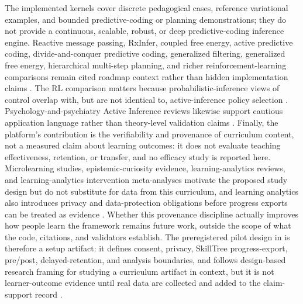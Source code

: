 \documentclass[
  english,
]{article}
\begin{document}
The implemented kernels cover discrete pedagogical cases, reference
variational examples, and bounded predictive-coding or planning
demonstrations; they do not provide a continuous, scalable, robust, or
deep predictive-coding inference engine. Reactive message passing,
RxInfer, coupled free energy, active predictive coding,
divide-and-conquer predictive coding, generalized filtering, generalized
free energy, hierarchical multi-step planning, and richer
reinforcement-learning comparisons remain cited roadmap context rather
than hidden implementation claims
\citep{bagaev2023reactive_message_passing, bagaev2023rxinfer, nelson2025coupled_free_energy, rao2024active_predictive_coding, sennesh2024dcpc, friston2008dem, friston2010generalised, parr2019generalised}.
The RL comparison matters because probabilistic-inference views of
control overlap with, but are not identical to, active-inference policy
selection \citep{levine2018probabilistic}. Psychology-and-psychiatry
Active Inference reviews likewise support cautious application language
rather than theory-level validation claims
\citep{badcock2024psychology_psychiatry}. Finally, the platform's
contribution is the verifiability and provenance of curriculum content,
not a measured claim about learning outcomes: it does not evaluate
teaching effectiveness, retention, or transfer, and no efficacy study is
reported here. Microlearning studies, epistemic-curiosity evidence,
learning-analytics reviews, and learning-analytics intervention
meta-analyses motivate the proposed study design but do not substitute
for data from this curriculum, and learning analytics also introduces
privacy and data-protection obligations before progress exports can be
treated as evidence
\citep{monib2024microlearning_boundaries, rof2024microlearning_satisfaction, emin2026epistemic_curiosity_mind_wandering, liu2025learning_analytics_intervention_meta, hernandezcampos2025_learning_analytics_outcomes, liu2023_learning_analytics_privacy}.
Whether this provenance discipline actually improves how people learn
the framework remains future work, outside the scope of what the code,
citations, and validators establish. The preregistered pilot design in
 is therefore a setup artifact: it defines
consent, privacy, SkillTree progress-export, pre/post,
delayed-retention, and analysis boundaries, and follows design-based
research framing for studying a curriculum artifact in context, but it
is not learner-outcome evidence until real data are collected and added
to the claim-support record
\citep{designbasedresearchcollective2003, barab2004design_based}.
\end{document}
